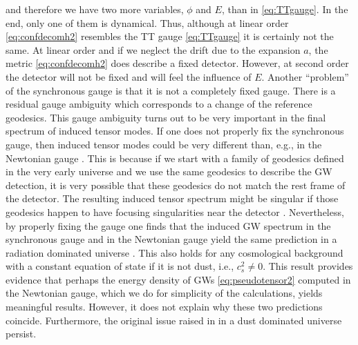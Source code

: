 \documentclass[a4paper,11pt]{article}
\numberwithin{equation}{section}
\begin{document}
and therefore we have two more variables, $\phi$ and $E$, than in \eqref{eq:TTgauge}. In the end, only one of them is dynamical. Thus, although at linear order \eqref{eq:confdecomh2} resembles the TT gauge \eqref{eq:TTgauge} it is certainly not the same. At linear order and if we neglect the drift due to the expansion $a$, the metric \eqref{eq:confdecomh2} does describe a fixed detector. However, at second order the detector will not be fixed and will feel the influence of $E$. Another ``problem'' of the synchronous gauge is that it is not a completely fixed gauge. There is a residual gauge ambiguity which corresponds to a change of the reference geodesics. This gauge ambiguity turns out to be very important in the final spectrum of induced tensor modes. If one does not properly fix the synchronous gauge, then induced tensor modes could be very different than, e.g., in the Newtonian gauge \cite{Lu:2020diy}. This is because if we start with a family of geodesics defined in the very early universe and we use the same geodesics to describe the GW detection, it is very possible that these geodesics do not match the rest frame of the detector. The resulting induced tensor spectrum might be singular if those geodesics happen to have focusing singularities near the detector \cite{Domenech:2020xin}. Nevertheless, by properly fixing the gauge one finds that the induced GW spectrum in the synchronous gauge and in the Newtonian gauge yield the same prediction in a radiation dominated universe \cite{DeLuca:2019ufz,Inomata:2019yww,Yuan:2019fwv,Lu:2020diy}. This also holds for any cosmological background with a constant equation of state \cite{Domenech:2020xin} if it is not dust, i.e., $c^2_s\neq0$. This result provides evidence that perhaps the energy density of GWs \eqref{eq:pseudotensor2} computed in the Newtonian gauge, which we do for simplicity of the calculations, yields meaningful results. However, it does not explain why these two predictions coincide. Furthermore, the original issue raised in \cite{Hwang:2017oxa} in a dust dominated universe persist. 
\end{document}
